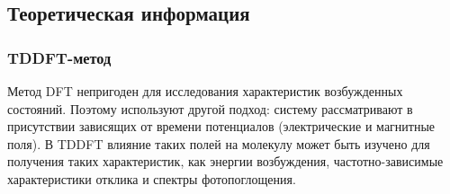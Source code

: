\subsection{Теоретическая информация}
\subsubsection{TDDFT-метод}
Метод DFT непригоден для исследования характеристик возбужденных состояний. Поэтому используют другой подход: систему рассматривают в присутствии зависящих от времени потенциалов (электрические и магнитные поля). В TDDFT влияние таких полей на молекулу может быть изучено для получения таких характеристик, как энергии возбуждения, частотно-зависимые характеристики отклика и спектры фотопоглощения. 